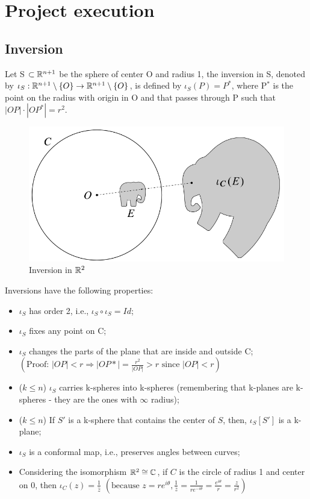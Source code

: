 \chapter{Project execution}\label{chp:realizacoes}

\section{Inversion}\label{inver}

\begin{definicao}[Inversion]
Let S $\subset \mathbb{R}^{n+1}$ be the sphere of center O and radius 1, the inversion in S, denoted by $\iota_S : \mathbb{R}^{n+1}\setminus{\{O\}} \rightarrow \mathbb{R}^{n+1}\setminus{\{O\}}$, is defined by $\iota_S (P) = P^*$, where P$^*$ is the point on the radius with origin in O and that passes through P such that $|OP| \cdot |OP^*| = r^2$.
\end{definicao}

\begin{figure}[H]
    \centering
    \includegraphics[scale=0.35]{inversao.png}
    \caption{Inversion in $\mathbb{R}^2$}
    \label{fig:5}
\end{figure}

Inversions have the following properties:
\begin{itemize}
    \item $\iota_S$ has order 2, i.e., $\iota_S \circ \iota_S = Id$;
    \item $\iota_S$ fixes any point on C;
    \item $\iota_S$ changes the parts of the plane that are inside and outside C;\\
    $\left(\mbox{Proof: }|OP|<r \Rightarrow |OP*|=\frac{r^2}{|OP|} > r \mbox{ since }|OP|<r\right)$
    \item ($k \leq n$) $\iota_S$ carries k-spheres into k-spheres (remembering that k-planes are k-spheres - they are the ones with $\infty$ radius);
    \item ($k \leq n$) If $S'$ is a k-sphere that contains the center of $S$, then, $\iota_S[S']$ is a k-plane;
    \item $\iota_S$ is a conformal map, i.e., preserves angles between curves;
    \item Considering the isomorphism $\mathbb{R}^2 \cong \mathbb{C}$, if $C$ is the circle of radius 1 and center on $0$, then $\iota_C(z) = \frac{1}{\hat{z}}$ $\left( \mbox{because } z=re^{i\theta}, \frac{1}{\bar{z}} = \frac{1}{re^{-i\theta}} = \frac{e^{i\theta}}{r} = \frac{z}{r^2}\right)$
\end{itemize}

